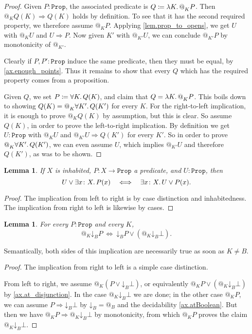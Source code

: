 \documentclass[11pt, oneside, article]{memoir}
\makeatletter
\theoremstyle{plain}
\newtheorem{lemma}[theorem]{Lemma}
\theoremstyle{definition}
\theoremstyle{remark}
\newcommand{\const}[1]{\mathtt{#1}}
\newcommand{\Prop}{\const{Prop}}
\newcommand{\AtSymbol}{{@}}
\newcommand{\SeeSymbol}{{\down}}  %
\newcommand{\At}[2][]{\AtSymbol^{#1}_{#2}}
\newcommand{\See}[2][]{\SeeSymbol^{#1}_{#2}}
\newcommand{\down}{\mathord{\downarrow}}
\newcommand{\imp}{\Rightarrow}
\makeatother
\begin{document}
\begin{proof}
	Given $P : \Prop$, the associated predicate is $Q \coloneqq \lambda K \ldotp \At{K} P$. Then $\At{K} Q(K) \imp Q(K)$ holds by definition. To see that it has the second required property, we therefore assume $\At{K} P$. Applying \cref{lem.prop_to_opens}, we get $U$ with $\At{K} U$ and $U \imp P$. Now given $K'$ with $\At{K'} U$, we can conclude $\At{K'} P$ by monotonicity of $\At{K'}$.

Clearly if $P, P' : \Prop$ induce the same predicate, then they must be equal, by \cref{ax.enough_points}. Thus it remains to show that every $Q$ which has the required property comes from a proposition.

Given $Q$, we set $P \coloneqq \forall K \ldotp Q(K)$, and claim that $Q = \lambda K \ldotp \At{K} P$. This boils down to showing $Q(K) = \At{K} \forall K' \ldotp Q(K')$ for every $K$. For the right-to-left implication, it is enough to prove $\At{K} Q(K)$ by assumption, but this is clear. So assume $Q(K)$, in order to prove the left-to-right implication. By definition we get $U : \Prop$ with $\At{K} U$ and $\At{K'} U \imp Q(K')$ for every $K'$. So in order to prove $\At{K} \forall K' \ldotp Q(K')$, we can even assume $U$, which implies $\At{K'} U$ and therefore $Q(K')$, as was to be shown.
\end{proof}


\begin{lemma}
	\label{lem.see_vs_exists}
	If $X$ is inhabited, $P : X \to \Prop$ a predicate, and $U : \Prop$, then
	\[
		U \lor \exists x \colon X \ldotp P(x) \quad \Longleftrightarrow \quad \exists x \colon X \ldotp U \lor P(x).
	\]
\end{lemma}

\begin{proof}
The implication from left to right is by case distinction and inhabitedness. The implication from right to left is likewise by cases.
\end{proof}

\begin{lemma}\label{lem.at_vs_codisc}
For every $P : \Prop$ and every $K$,
\[
	\At{K} \See{B} P \: \Leftrightarrow \: \See{B} P \vee \left( \At{K} \See{B} \bot \right).
\]
\end{lemma}

Semantically, both sides of this implication are necessarily true as soon as $K \neq B$.

\begin{proof}
The implication from right to left is a simple case distinction. 

From left to right, we assume $\At{K}(P \vee \See{B} \bot)$, or equivalently $\At{K} P \vee (\At{K} \See{B} \bot)$ by \cref{ax.at_disjunction}. In the case $\At{K} \See{B} \bot$ we are done; in the other case $\At{K} P$, we can assume $P \imp \See{B} \bot$ by $\See{B} = \At{B}$ and the decidability \cref{ax.atBoolean}. But then we have $\At{K} P \imp \At{K} \See{B} \bot$ by monotonicity, from which $\At{K} P$ proves the claim $\At{K} \See{B} \bot$.
\end{proof}
\end{document}
